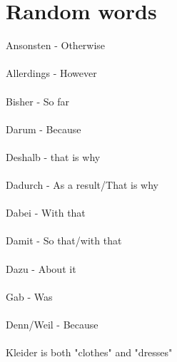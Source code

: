 \documentclass{article}
\begin{document}
\section{Random words}
Ansonsten - Otherwise
\\ \\
Allerdings - However
\\ \\
Bisher - So far
\\ \\
Darum - Because
\\ \\
Deshalb - that is why
\\ \\
Dadurch - As a result/That is why
\\ \\
Dabei - With that
\\ \\
Damit - So that/with that
\\ \\
Dazu - About it
\\ \\
Gab - Was
\\ \\
Denn/Weil - Because
\\ \\
Kleider is both "clothes" and "dresses"
\end{document}
